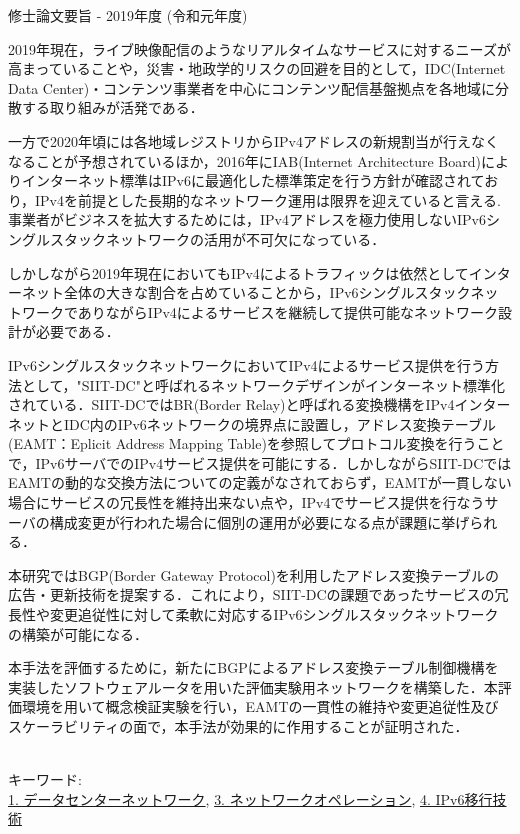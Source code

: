 修士論文要旨 - 2019年度 (令和元年度)
\begin{center}
\begin{large}
\end{large}
\end{center}

2019年現在，ライブ映像配信のようなリアルタイムなサービスに対するニーズが高まっていることや，災害・地政学的リスクの回避を目的として，IDC(Internet Data Center)・コンテンツ事業者を中心にコンテンツ配信基盤拠点を各地域に分散する取り組みが活発である．

一方で2020年頃には各地域レジストリからIPv4アドレスの新規割当が行えなくなることが予想されているほか，2016年にIAB(Internet Architecture Board)によりインターネット標準はIPv6に最適化した標準策定を行う方針が確認されており，IPv4を前提とした長期的なネットワーク運用は限界を迎えていると言える.事業者がビジネスを拡大するためには，IPv4アドレスを極力使用しないIPv6シングルスタックネットワークの活用が不可欠になっている．

しかしながら2019年現在においてもIPv4によるトラフィックは依然としてインターネット全体の大きな割合を占めていることから，IPv6シングルスタックネットワークでありながらIPv4によるサービスを継続して提供可能なネットワーク設計が必要である．

IPv6シングルスタックネットワークにおいてIPv4によるサービス提供を行う方法として，"SIIT-DC"と呼ばれるネットワークデザインがインターネット標準化されている．SIIT-DCではBR(Border Relay)と呼ばれる変換機構をIPv4インターネットとIDC内のIPv6ネットワークの境界点に設置し，アドレス変換テーブル(EAMT：Eplicit Address Mapping Table)を参照してプロトコル変換を行うことで，IPv6サーバでのIPv4サービス提供を可能にする．しかしながらSIIT-DCではEAMTの動的な交換方法についての定義がなされておらず，EAMTが一貫しない場合にサービスの冗長性を維持出来ない点や，IPv4でサービス提供を行なうサーバの構成変更が行われた場合に個別の運用が必要になる点が課題に挙げられる．

本研究ではBGP(Border Gateway Protocol)を利用したアドレス変換テーブルの広告・更新技術を提案する．これにより，SIIT-DCの課題であったサービスの冗長性や変更追従性に対して柔軟に対応するIPv6シングルスタックネットワークの構築が可能になる．

本手法を評価するために，新たにBGPによるアドレス変換テーブル制御機構を実装したソフトウェアルータを用いた評価実験用ネットワークを構築した．本評価環境を用いて概念検証実験を行い，EAMTの一貫性の維持や変更追従性及びスケーラビリティの面で，本手法が効果的に作用することが証明された．

~ \\

キーワード:\\
\underline{1. データセンターネットワーク},
\underline{3. ネットワークオペレーション},
\underline{4. IPv6移行技術}
\begin{flushright}
\dept \\
\author
\end{flushright}
